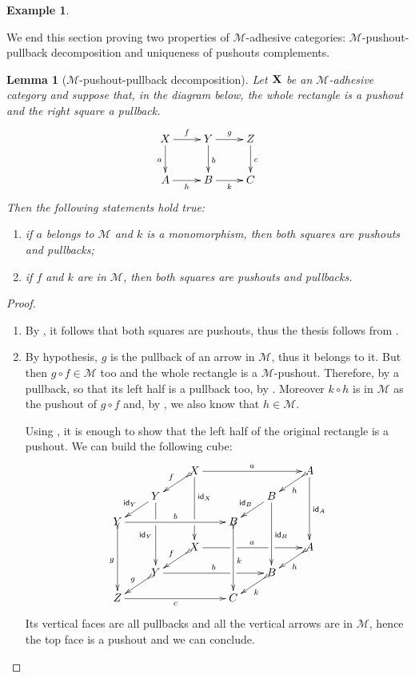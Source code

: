 \documentclass[a4paper]{article}
\newcommand{\id}[1]{\mathsf{id}_{#1}}
\def\X{\textbf {\textup{X}}}
\def\Y{\textbf {\textup{Y}}}
\newtheorem{lemma}[theorem]{Lemma}
\theoremstyle{definition}
\newtheorem{example}[theorem]{Example}
\begin{document}
\begin{example}
\end{example}

We end this section proving two properties of $\mathcal{M}$-adhesive categories:  $\mathcal{M}$-pushout-pullback decomposition and uniqueness of pushouts complements.


\begin{lemma}[$\mathcal{M}$-pushout-pullback decomposition]\label{lem:popb} Let $\X$ be an $\mathcal{M}$-adhesive category  and suppose that, in the diagram below, the whole rectangle is a pushout and the right square a pullback.
\[\xymatrix{X \ar[d]_{a} \ar[r]^{f}& \ar[r]^{g} Y \ar[d]^{b}& Z \ar[d]^{c}\\ A \ar[r]_{h}& B \ar[r]_{k}& C}\]
	Then the following statements hold true:
	\begin{enumerate}
\item if $a$ belongs to $\mathcal{M}$ and $k$ is a monomorphism,  then both squares are pushouts and pullbacks;
\item if $f$ and $k $ are in  $\mathcal{M}$, then both squares are pushouts and pullbacks.
	\end{enumerate}
\end{lemma}
\begin{proof}
\begin{enumerate}
	\item By , it follows that both squares are pushouts, thus the thesis follows from .
	\item By hypothesis, $g$ is the pullback of an arrow in $\mathcal{M}$, thus it belongs to it. But then $g\circ f\in \mathcal{M}$ too  and the whole rectangle is a $\mathcal{M}$-pushout. Therefore, by  a pullback, so that its left half is a pullback too, by . Moreover $k\circ h$ is in $\mathcal{M}$ as the pushout of $g\circ f$ and, by , we also know that $h\in \mathcal{M}$.  
	
	Using , it is enough to show that the left half of the original rectangle is a pushout. We can build the following cube:
	\[\xymatrix@C=20pt@R=10pt{ & &X\ar@{>->}[dl]_{f} \ar[ddd]^(.333333){\id{X}}|(.666666)\hole\ar[rrr]^{a} &&&A \ar[ddd]^{\id{A}} \ar@{>->}[dl]^{h}\\& Y\ar[dl]_{\id{Y}} \ar[ddd]|(.333333)\hole_{\id{Y}} &&&B \ar[ddd]^{\id{B}} \ar[dl]_{\id{B}} \\Y \ar@{>->}[ddd]_{g} \ar[rrr]^{b}&&& B\ar@{>->}[ddd]^{k}\\&&X \ar[rrr]|(.34)\hole^{a}|(.67)\hole \ar@{>->}[dl]_{f}&&& A \ar@{>->}[dl]^{h}\\ & Y \ar[rrr]|(.67)\hole^{b} \ar@{>->}[dl]_{g}&&& B \ar@{>->}[dl]^{k}\\ Z\ar[rrr]_{c} &&& C}\]
	Its vertical faces are all pullbacks and all the vertical arrows are in $\mathcal{M}$, hence the top face is a pushout and we can conclude. \qedhere 
\end{enumerate}
\end{proof}
\end{document}
